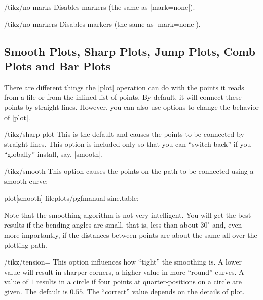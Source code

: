 \begin{stylekey}{/tikz/no marks}
	Disables markers (the same as |mark=none|).
\end{stylekey}
\begin{stylekey}{/tikz/no markers}
	Disables markers (the same as |mark=none|).
\end{stylekey}



\subsection{Smooth Plots, Sharp Plots, Jump Plots, Comb Plots and Bar Plots}

There are different things the |plot| operation can do with the points
it reads from a file or from the inlined list of points. By default,
it will connect these points by straight lines. However, you can also
use options to change the behavior of |plot|.

\begin{key}{/tikz/sharp plot}
  This is the default and causes the points to be connected by
  straight lines. This option is included only so that you can
  ``switch back'' if you ``globally'' install, say, |smooth|.
\end{key}

\begin{key}{/tikz/smooth}
  This option causes the points on the path to be connected using a
  smooth curve:

\begin{codeexample}[]
\tikz\draw plot[smooth] file{plots/pgfmanual-sine.table};
\end{codeexample}

  Note that the smoothing algorithm is not very intelligent. You will
  get the best results if the bending angles are small, that is, less
  than about $30^\circ$ and, even more importantly, if the distances
  between points are about the same all over the plotting path.
\end{key}

\begin{key}{/tikz/tension=}
  This option influences how ``tight'' the smoothing is. A lower value
  will result in sharper corners, a higher value in more ``round''
  curves. A value of $1$ results in a circle if four points at
  quarter-positions on a circle are given. The default is $0.55$. The
  ``correct'' value depends on the details of plot.

\begin{codeexample}[]
\end{codeexample}
\end{key}

